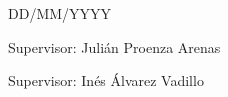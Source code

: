 \begin{center}
\vspace*{0.75cm}
\noindent \Large DD/MM/YYYY

\vspace*{1cm}
\noindent \large{Supervisor: Julián Proenza Arenas\\}

\vspace*{0.5cm}
\noindent \large{Supervisor: Inés Álvarez Vadillo\\}



\end{center}
\twocolumn
\newpage